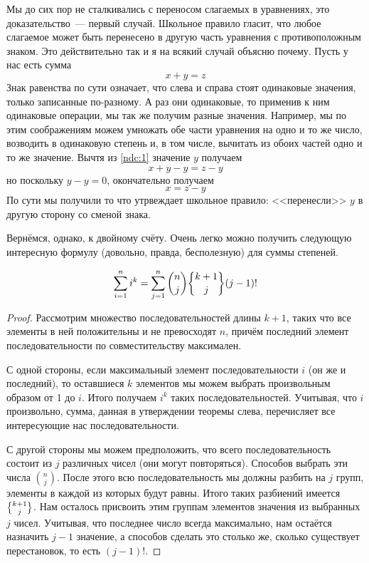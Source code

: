 Мы до сих пор не сталкивались с переносом слагаемых в уравнениях, это доказательство~--- первый случай. Школьное правило гласит, что любое слагаемое может быть перенесено в другую часть уравнения с противоположным знаком. Это действительно так и я на всякий случай объясню почему. Пусть у нас есть сумма
\begin{equation}\label{ndc:1}
x+y = z
\end{equation}
Знак равенства по сути означает, что слева и справа стоят одинаковые значения, только записанные по-разному. А раз они одинаковые, то применив к ним одинаковые операции, мы так же получим разные значения. Например, мы по этим соображениям можем умножать обе части уравнения на одно и то же число, возводить в одинаковую степень и, в том числе, вычитать из обоих частей одно и то же значение. Вычтя из \eqref{ndc:1} значение $y$ получаем
$$x + y - y = z - y$$
но поскольку $y-y=0$, окончательно получаем
$$x = z - y$$
По сути мы получили то что утрвеждает школьное правило: <<перенесли>> $y$ в другую сторону со сменой знака.

Вернёмся, однако, к двойному счёту. Очень легко можно получить следующую интересную формулу (довольно, правда, бесполезную) для суммы степеней.

\begin{thm}
$$\sum_{i=1}^n i^k = \sum_{j=1}^n {n \choose j}\sstirling{k+1}{j}(j-1)!$$
\end{thm}
\begin{proof}
Рассмотрим множество последовательностей длины $k+1$, таких что все элементы в ней положительны и не превосходят $n$, причём последний элемент последовательности по совместительству максимален.

С одной стороны, если максимальный элемент последовательности $i$ (он же и последний), то оставшиеся $k$ элементов мы можем выбрать произвольным образом от 1 до $i$. Итого получаем $i^k$ таких последовательностей. Учитывая, что $i$ произвольно, сумма, данная в утверждении теоремы слева, перечисляет все интересующие нас последовательности.

С другой стороны мы можем предположить, что всего последовательность состоит из $j$ различных чисел (они могут повторяться). Способов выбрать эти числа $n\choose j$. После этого всю последовательность мы должны разбить на $j$ групп, элементы в каждой из которых будут равны. Итого таких разбиений имеется $\sstirling{k+1}{j}$. Нам осталось присвоить этим группам элементов значения из выбранных $j$ чисел. Учитывая, что последнее число всегда максимально, нам остаётся назначить $j-1$ значение, а способов сделать это столько же, сколько существует перестановок, то есть $(j-1)!$.
\end{proof}

